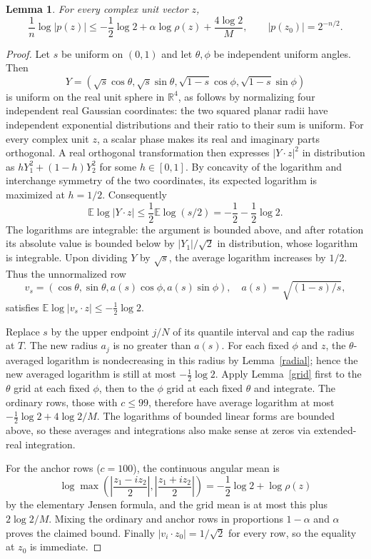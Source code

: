 \documentclass[11pt]{article}
\newtheorem{lemma}{Lemma}
\newcommand{\E}{\mathbb E}
\newcommand{\R}{\mathbb R}
\begin{document}
\begin{lemma}\label{global}
For every complex unit vector $z$,
\[
 \frac1n\log|p(z)|\le-\frac12\log2+\alpha\log\rho(z)+\frac{4\log2}{M},
 \qquad |p(z_0)|=2^{-n/2}.
\]
\end{lemma}
\begin{proof}
Let $s$ be uniform on $(0,1)$ and let $\theta,\phi$ be independent uniform angles. Then
\[
 Y=(\sqrt{s}\cos\theta,\sqrt{s}\sin\theta,\sqrt{1-s}\cos\phi,\sqrt{1-s}\sin\phi)
\]
is uniform on the real unit sphere in $\R^4$, as follows by normalizing four independent real Gaussian coordinates: the two squared planar radii have independent exponential distributions and their ratio to their sum is uniform. For every complex unit $z$, a scalar phase makes its real and imaginary parts orthogonal. A real orthogonal transformation then expresses $|Y\cdot z|^2$ in distribution as $hY_1^2+(1-h)Y_2^2$ for some $h\in[0,1]$. By concavity of the logarithm and interchange symmetry of the two coordinates, its expected logarithm is maximized at $h=1/2$. Consequently
\[
 \E\log|Y\cdot z|\le\frac12\E\log(s/2)=-\frac12-\frac12\log2.
\]
The logarithms are integrable: the argument is bounded above, and after rotation its absolute value is bounded below by $|Y_1|/\sqrt2$ in distribution, whose logarithm is integrable. Upon dividing $Y$ by $\sqrt{s}$, the average logarithm increases by $1/2$. Thus the unnormalized row
\[
 v_s=(\cos\theta,\sin\theta,a(s)\cos\phi,a(s)\sin\phi),\quad a(s)=\sqrt{(1-s)/s},
\]
satisfies $\E\log|v_s\cdot z|\le-\frac12\log2$.

Replace $s$ by the upper endpoint $j/N$ of its quantile interval and cap the radius at $T$. The new radius $a_j$ is no greater than $a(s)$. For each fixed $\phi$ and $z$, the $\theta$-averaged logarithm is nondecreasing in this radius by Lemma~\ref{radial}; hence the new averaged logarithm is still at most $-\frac12\log2$. Apply Lemma~\ref{grid} first to the $\theta$ grid at each fixed $\phi$, then to the $\phi$ grid at each fixed $\theta$ and integrate. The ordinary rows, those with $c\le99$, therefore have average logarithm at most $-\frac12\log2+4\log2/M$. The logarithms of bounded linear forms are bounded above, so these averages and integrations also make sense at zeros via extended-real integration.

For the anchor rows ($c=100$), the continuous angular mean is
\[
 \log\max\left(\left|\frac{z_1-iz_2}{2}\right|,\left|\frac{z_1+iz_2}{2}\right|\right)
 =-\frac12\log2+\log\rho(z)
\]
by the elementary Jensen formula, and the grid mean is at most this plus $2\log2/M$. Mixing the ordinary and anchor rows in proportions $1-\alpha$ and $\alpha$ proves the claimed bound. Finally $|v_i\cdot z_0|=1/\sqrt2$ for every row, so the equality at $z_0$ is immediate.
\end{proof}
\end{document}
